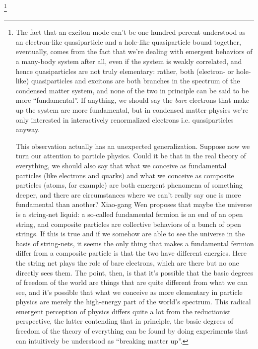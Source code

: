 \documentclass[hyperref, a4paper, 12pt]{report}
\begin{document}
\footnote{
    The fact that an exciton mode can't be one hundred percent
    understood as an electron-like quasiparticle and a hole-like quasiparticle bound together,
    eventually, comes from the fact that we're dealing with emergent behaviors of a many-body system after all,
    even if the system is weakly correlated,
    and hence quasiparticles are not truly elementary:
    rather, both (electron- or hole-like) quasiparticles and excitons
    are both branches in the spectrum of the condensed matter system,
    and none of the two in principle can be said to be more ``fundamental''.
    If anything, we should say the \emph{bare} electrons that make up the system
    are more fundamental, but in condensed matter physics we're only interested in 
    interactively renormalized electrons i.e. quasiparticles anyway.

    This observation actually has an unexpected generalization.
    Suppose now we turn our attention to particle physics.
    Could it be that in the real theory of everything,
    we should also say that what we conceive as fundamental particles (like electrons and quarks)
    and what we conceive as composite particles (atoms, for example)
    are both emergent phenomena of something deeper,
    and there are circumstances where we can't really say one is more fundamental than another?
    Xiao-gang Wen proposes that maybe the universe is a string-net liquid:
    a so-called fundamental fermion is an end of an open string,
    and composite particles are collective behaviors of a bunch of open strings.
    If this is true and if we somehow are able to see the universe in the basis of string-nets,
    it seems the only thing that makes a fundamental fermion differ from a composite particle
    is that the two have different energies.
    Here the string net plays the role of bare electrons,
    which are there but no one directly sees them.
    The point, then, is that it's possible that the basic degrees of freedom of the world
    are things that are quite different from what we can see,
    and it's possible that what we conceive as more elementary in particle physics
    are merely the high-energy part of the world's spectrum.
    This radical emergent perception of physics differs quite a lot from the reductionist perspective,
    the latter contending that in principle,
    the basic degrees of freedom of the theory of everything
    can be found by doing experiments that can intuitively be understood as ``breaking matter up''.
}
\end{document}
